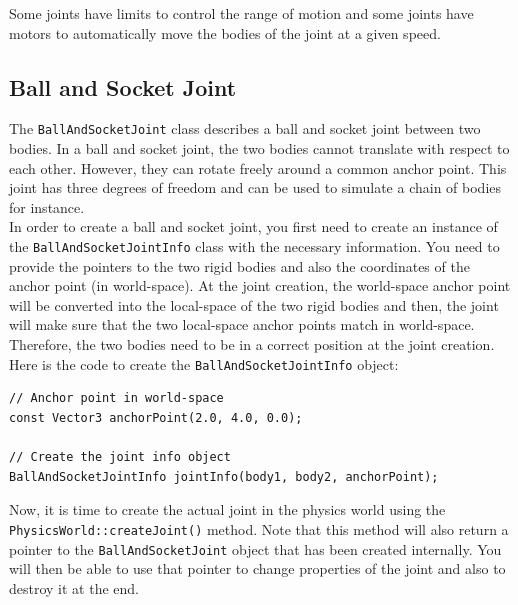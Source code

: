 \documentclass[a4paper,12pt]{article}
\begin{document}
    Some joints have limits to control the range of motion and some joints have motors to automatically move the bodies of the joint at a given speed. \\

    \subsection{Ball and Socket Joint}

    The \texttt{BallAndSocketJoint} class describes a ball and socket joint between two bodies. In a ball and socket joint, the two bodies cannot translate with respect to each other.
    However, they can rotate freely around a common anchor point. This joint has three degrees of freedom and can be used to simulate a chain of bodies for instance. \\

    In order to create a ball and socket joint, you first need to create an instance of the \texttt{BallAndSocketJointInfo} class with the necessary information. You need to provide the pointers to the
    two rigid bodies and also the coordinates of the anchor point (in world-space). At the joint creation, the world-space anchor point will be converted into the local-space of the two rigid
    bodies and then, the joint will make sure that the two local-space anchor points match in world-space. Therefore, the two bodies need to be in a correct position at the joint creation. \\

    Here is the code to create the \texttt{BallAndSocketJointInfo} object: \\

    \begin{lstlisting}
// Anchor point in world-space
const Vector3 anchorPoint(2.0, 4.0, 0.0);

// Create the joint info object
BallAndSocketJointInfo jointInfo(body1, body2, anchorPoint);
  \end{lstlisting}

    \vspace{0.6cm}

    \begin{sloppypar}
    Now, it is time to create the actual joint in the physics world using the \texttt{PhysicsWorld::createJoint()} method.
    Note that this method will also return a pointer to the \texttt{BallAndSocketJoint} object that has been created internally. You will then
    be able to use that pointer to change properties of the joint and also to destroy it at the end. \\
    \end{sloppypar}
\end{document}
